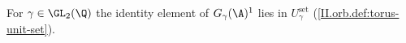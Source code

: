 For $\gamma\in\GL_2(\Q)$ the identity element of $G_\gamma(\A)^1$ lies in $U_\gamma^{\mathrm{set}}$ (\cref{II.orb.def:torus-unit-set}).
